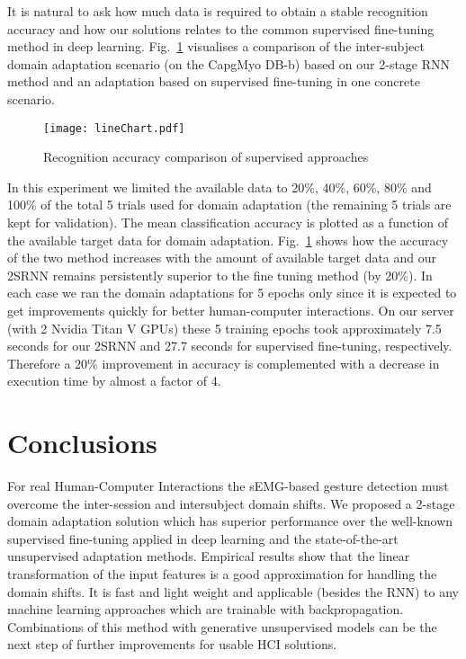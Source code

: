 \documentclass[conference]{IEEEtran}
\begin{document}
{\begin{minipage}{\textwidth}
It is natural to ask how much data is required to obtain a stable recognition accuracy and how our solutions relates to the common supervised fine-tuning method in deep learning.
Fig.~\ref{figure:lineChart} visualises a comparison of the inter-subject domain adaptation scenario (on the CapgMyo DB-b) based on our 2-stage RNN method and an adaptation based on supervised fine-tuning in one concrete scenario.
\begin{figure}[tbp]
	\centerline{\texttt{[image: lineChart.pdf]}}
	\caption{Recognition accuracy comparison of supervised approaches}
	\label{figure:lineChart}
\end{figure}
In this experiment we limited the available data to 20\%, 40\%, 60\%, 80\% and 100\%
of the total 5 trials used for domain adaptation (the remaining 5 trials are kept for validation). The mean classification accuracy is plotted as a function of the available target data for domain adaptation. Fig.~\ref{figure:lineChart} shows how the accuracy of the two method
increases with the amount of available target data and our 2SRNN remains persistently superior to the fine tuning method (by 20\%).
In each case we ran the domain adaptations for 5 epochs only since it is expected to get improvements quickly for better human-computer interactions.
On our server (with 2 Nvidia Titan V GPUs) these 5 training epochs took approximately 7.5 seconds for our 2SRNN and 27.7 seconds for supervised fine-tuning, respectively. Therefore a 20\% improvement in accuracy is complemented with a decrease in execution time by almost a factor of 4.

\section{Conclusions}

For real Human-Computer Interactions the sEMG-based gesture detection must overcome the inter-session and intersubject domain shifts. We proposed a 2-stage domain adaptation solution which has superior performance over the well-known supervised fine-tuning applied in deep learning and the state-of-the-art unsupervised adaptation methods. Empirical results show that the linear transformation of the input features is a good approximation for handling the domain shifts. It is fast and light weight and applicable (besides the RNN) to any machine learning approaches which are trainable with backpropagation. Combinations of this method with generative unsupervised models can be the next step of further improvements for usable HCI solutions.


\end{minipage}}
\end{document}
